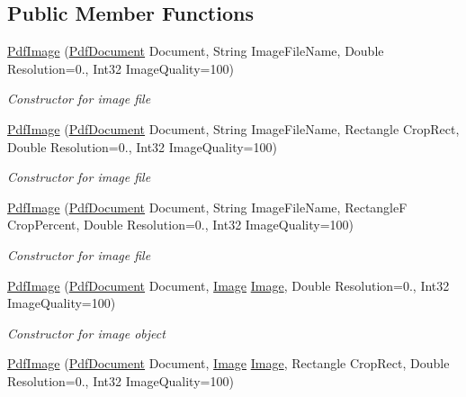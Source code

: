 \subsection*{Public Member Functions}
\begin{DoxyCompactItemize}
\item 
\hyperlink{class_pdf_file_writer_1_1_pdf_image_abcd6ef5b073c08674a53e5f82c85d5e8}{Pdf\+Image} (\hyperlink{class_pdf_file_writer_1_1_pdf_document}{Pdf\+Document} Document, String Image\+File\+Name, Double Resolution=0., Int32 Image\+Quality=100)
\begin{DoxyCompactList}\small\item\em Constructor for image file \end{DoxyCompactList}\item 
\hyperlink{class_pdf_file_writer_1_1_pdf_image_ad007c0624939e727c20070bef77a2858}{Pdf\+Image} (\hyperlink{class_pdf_file_writer_1_1_pdf_document}{Pdf\+Document} Document, String Image\+File\+Name, Rectangle Crop\+Rect, Double Resolution=0., Int32 Image\+Quality=100)
\begin{DoxyCompactList}\small\item\em Constructor for image file \end{DoxyCompactList}\item 
\hyperlink{class_pdf_file_writer_1_1_pdf_image_a0a4029db0336bc5c0ebd1dd9550832cd}{Pdf\+Image} (\hyperlink{class_pdf_file_writer_1_1_pdf_document}{Pdf\+Document} Document, String Image\+File\+Name, RectangleF Crop\+Percent, Double Resolution=0., Int32 Image\+Quality=100)
\begin{DoxyCompactList}\small\item\em Constructor for image file \end{DoxyCompactList}\item 
\hyperlink{class_pdf_file_writer_1_1_pdf_image_adbcc0bc964be4716db7e3ce7d411fdee}{Pdf\+Image} (\hyperlink{class_pdf_file_writer_1_1_pdf_document}{Pdf\+Document} Document, \hyperlink{namespace_pdf_file_writer_a45e52c090a4d8e1333577773ec0bac4aabe53a0541a6d36f6ecb879fa2c584b08}{Image} \hyperlink{namespace_pdf_file_writer_a45e52c090a4d8e1333577773ec0bac4aabe53a0541a6d36f6ecb879fa2c584b08}{Image}, Double Resolution=0., Int32 Image\+Quality=100)
\begin{DoxyCompactList}\small\item\em Constructor for image object \end{DoxyCompactList}\item 
\hyperlink{class_pdf_file_writer_1_1_pdf_image_ad6d630c8ce425a94924abcd617cd6b68}{Pdf\+Image} (\hyperlink{class_pdf_file_writer_1_1_pdf_document}{Pdf\+Document} Document, \hyperlink{namespace_pdf_file_writer_a45e52c090a4d8e1333577773ec0bac4aabe53a0541a6d36f6ecb879fa2c584b08}{Image} \hyperlink{namespace_pdf_file_writer_a45e52c090a4d8e1333577773ec0bac4aabe53a0541a6d36f6ecb879fa2c584b08}{Image}, Rectangle Crop\+Rect, Double Resolution=0., Int32 Image\+Quality=100)

\end{DoxyCompactItemize}
